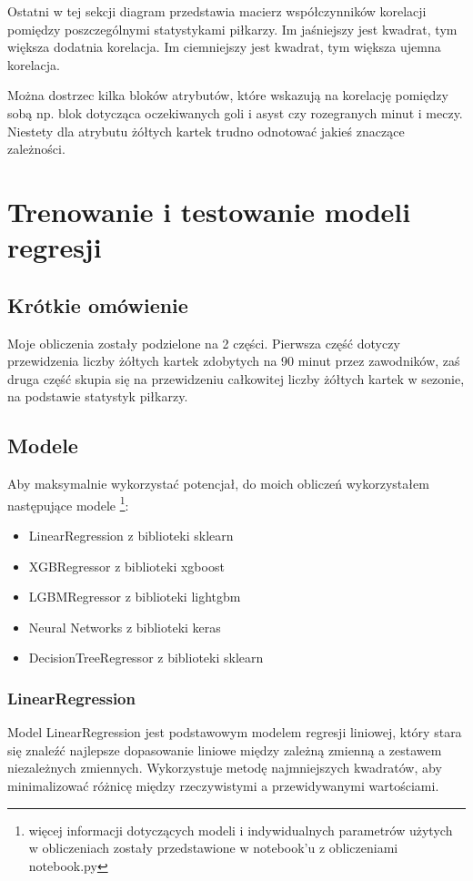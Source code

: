 \documentclass{article}
\begin{document}
Ostatni w tej sekcji diagram przedstawia macierz współczynników korelacji pomiędzy poszczególnymi statystykami piłkarzy. Im jaśniejszy jest kwadrat, tym większa dodatnia korelacja. Im ciemniejszy jest kwadrat, tym większa ujemna korelacja.

Można dostrzec kilka bloków atrybutów, które wskazują na korelację pomiędzy sobą np. blok dotycząca oczekiwanych goli i asyst czy rozegranych minut i meczy. Niestety dla atrybutu żółtych kartek trudno odnotować jakieś znaczące zależności.

\newpage
\section{Trenowanie i testowanie modeli regresji}

\subsection{Krótkie omówienie}

Moje obliczenia zostały podzielone na 2 części. Pierwsza część dotyczy przewidzenia liczby żółtych kartek zdobytych na 90 minut przez zawodników, zaś druga część skupia się na przewidzeniu całkowitej liczby żółtych kartek w sezonie, na podstawie statystyk piłkarzy.

\subsection{Modele}

Aby maksymalnie wykorzystać potencjał, do moich obliczeń wykorzystałem następujące modele \footnote{więcej informacji dotyczących modeli i indywidualnych parametrów użytych w obliczeniach zostały przedstawione w notebook’u z obliczeniami notebook.py}:

\begin{itemize}
    \item LinearRegression z biblioteki sklearn
    \item XGBRegressor z biblioteki xgboost
    \item LGBMRegressor z biblioteki lightgbm
    \item Neural Networks z biblioteki keras
    \item DecisionTreeRegressor z biblioteki sklearn
\end{itemize}

\subsubsection{LinearRegression}
Model LinearRegression jest podstawowym modelem regresji liniowej, który stara się znaleźć najlepsze dopasowanie liniowe między zależną zmienną a zestawem niezależnych zmiennych. Wykorzystuje metodę najmniejszych kwadratów, aby minimalizować różnicę między rzeczywistymi a przewidywanymi wartościami.
\end{document}
